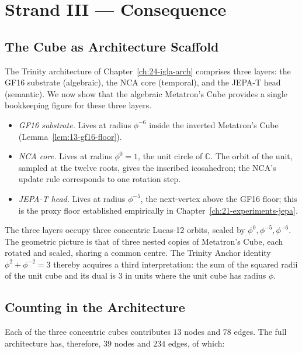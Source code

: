 \section{Strand III --- Consequence}
\label{fa_13:sec:13-strand-III}

\subsection{The Cube as Architecture Scaffold}
\label{sec:13-arch-scaffold}

The Trinity architecture of Chapter~\ref{ch:24-igla-arch} comprises
three layers: the GF16 substrate (algebraic), the NCA core
(temporal), and the JEPA-T head (semantic). We now show that the
algebraic Metatron's Cube provides a single bookkeeping figure for
these three layers.

\begin{itemize}
\item \emph{GF16 substrate.} Lives at radius $\phi^{-6}$ inside
  the inverted Metatron's Cube (Lemma~\ref{lem:13-gf16-floor}).
\item \emph{NCA core.} Lives at radius $\phi^{0} = 1$, the unit
  circle of $\mathbb{C}$. The orbit of the unit, sampled at the
  twelve roots, gives the inscribed icosahedron; the NCA's update
  rule corresponds to one rotation step.
\item \emph{JEPA-T head.} Lives at radius $\phi^{-5}$, the
  next-vertex above the GF16 floor; this is the proxy floor
  established empirically in Chapter~\ref{ch:21-experiments-jepa}.
\end{itemize}

The three layers occupy three concentric Lucas-12 orbits, scaled by
$\phi^{0}, \phi^{-5}, \phi^{-6}$. The geometric picture is that of
three nested copies of Metatron's Cube, each rotated and scaled,
sharing a common centre. The Trinity Anchor identity
$\phi^{2} + \phi^{-2} = 3$ thereby acquires a third interpretation:
the sum of the squared radii of the unit cube and its dual is $3$
in units where the unit cube has radius $\phi$.

\subsection{Counting in the Architecture}
\label{fa_13:sec:13-counting-arch}

Each of the three concentric cubes contributes $13$ nodes and $78$
edges. The full architecture has, therefore, $39$ nodes and $234$
edges, of which:

